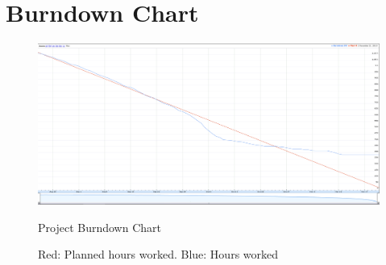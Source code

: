 \section{Burndown Chart}
\begin{figure}[H]
\includegraphics[width=17cm]{images/burndown_chart.png}
\caption{Project Burndown Chart}
\caption*{Red: Planned hours worked. Blue: Hours worked}
\end{figure}